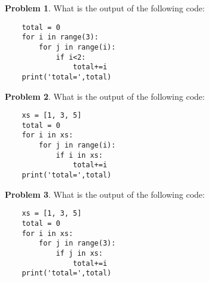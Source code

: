 \documentclass[10pt]{article}
\theoremstyle{definition}
\newtheorem{problem}{Problem}
\begin{document}
\newpage
\begin{problem}
    What is the output of the following code:
\end{problem}
\begin{lstlisting}
    total = 0
    for i in range(3):
        for j in range(i):
            if i<2:
                total+=i
    print('total=',total)
\end{lstlisting}
\vspace{1.5in}

\begin{problem}
    What is the output of the following code:
\end{problem}
\begin{lstlisting}
    xs = [1, 3, 5]
    total = 0
    for i in xs:
        for j in range(i):
            if i in xs:
                total+=i
    print('total=',total)
\end{lstlisting}
\vspace{1.5in}

\begin{problem}
    What is the output of the following code:
\end{problem}
\begin{lstlisting}
    xs = [1, 3, 5]
    total = 0
    for i in xs:
        for j in range(3):
            if j in xs:
                total+=i
    print('total=',total)
\end{lstlisting}
\end{document}
